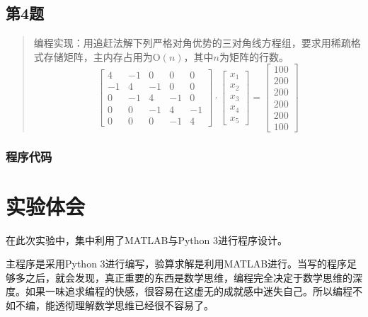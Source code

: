 \subsection{第4题}
\begin{quote}
    {\kaishu
        编程实现：用追赶法解下列严格对角优势的三对角线方程组，要求用稀疏格式存储矩阵，主内存占用为$\mathrm{O}(n)$，其中$n$为矩阵的行数。
    }
    \begin{equation}
        \left[ \begin{array}{rrrrr}
            {4} & {-1} & {0} & {0} & {0} \\ {-1} & {4} & {-1} & {0} & {0} \\ {0} & {-1} & {4} & {-1} & {0} \\ {0} & {0} & {-1} & {4} & {-1} \\ {0} & {0} & {0} & {-1} & {4}\end{array}\right] \cdot \left[ \begin{array}{c}{x_{1}} \\ {x_{2}} \\ {x_{3}} \\ {x_{4}} \\ {x_{5}}\end{array}\right]=\left[ \begin{array}{c}{100} \\ {200} \\ {200} \\ {200} \\ {200} \\ {100}
        \end{array}\right]
    \end{equation}
\end{quote}

\subsubsection{程序代码}


\section{实验体会}

在此次实验中，集中利用了MATLAB与Python 3进行程序设计。

主程序是采用Python 3进行编写，验算求解是利用MATLAB进行。当写的程序足够多之后，就会发现，真正重要的东西是数学思维，编程完全决定于数学思维的深度。如果一味追求编程的快感，很容易在这虚无的成就感中迷失自己。所以编程不如不编，能透彻理解数学思维已经很不容易了。

